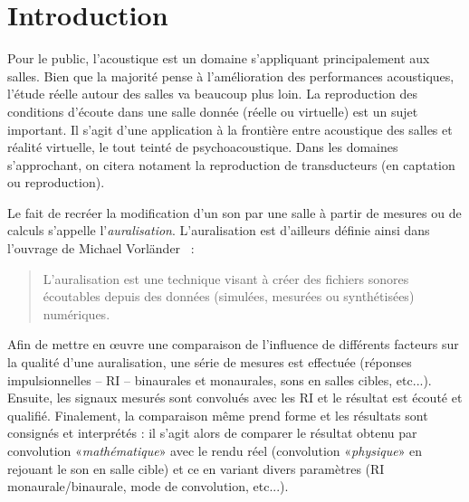 \chapter*{Introduction}

Pour le public, l'acoustique est un domaine s'appliquant principalement aux salles.
Bien que la majorité pense à l'amélioration des performances acoustiques, l'étude réelle autour des salles va
beaucoup plus loin.
La reproduction des conditions d'écoute dans une salle donnée (réelle ou virtuelle) est un sujet important. Il s'agit d'une
application à la frontière entre acoustique des salles et réalité virtuelle, le tout teinté de psychoacoustique. Dans les
domaines s'approchant, on citera notament la reproduction de transducteurs (en captation ou reproduction).

\medskip

Le fait de recréer la modification d'un son par une salle à partir de mesures ou de calculs s'appelle
l'\emph{auralisation}. L'auralisation est d'ailleurs définie ainsi dans l'ouvrage de Michael
Vorländer~\cite{Vor08} :

\begin{quote}
L'auralisation est une technique visant à créer des fichiers sonores écoutables depuis des données (simulées, mesurées
ou synthétisées) numériques.
\end{quote}

\medskip

Afin de mettre en œuvre une comparaison de l'influence de différents facteurs sur la qualité d'une auralisation, une
série de mesures est effectuée (réponses impulsionnelles -- RI --  binaurales et monaurales, sons en salles cibles,
etc...).  Ensuite, les signaux mesurés sont convolués avec les RI et le résultat est écouté et qualifié. Finalement, la
comparaison même prend forme et les résultats sont consignés et interprétés : il s'agit alors de comparer le résultat
obtenu par convolution «\emph{mathématique}» avec le rendu réel (convolution «\emph{physique}» en rejouant le son en
salle cible) et ce en variant divers paramètres (RI monaurale/binaurale, mode de convolution, etc...).
